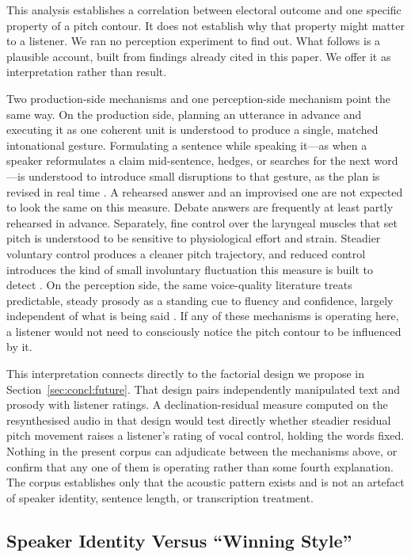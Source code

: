 \documentclass[pdflatex,sn-mathphys-num]{sn-jnl}%
\begin{document}
This analysis establishes a correlation between electoral outcome and one
specific property of a pitch contour. It does not establish why that
property might matter to a listener. We ran no perception experiment to
find out. What follows is a plausible account, built from findings already
cited in this paper. We offer it as interpretation rather than result.

Two production-side mechanisms and one perception-side mechanism point the
same way. On the production side, planning an utterance in advance and
executing it as one coherent unit is understood to produce a single, matched
intonational gesture. Formulating a sentence while speaking it---as when a speaker reformulates a
claim mid-sentence, hedges, or searches for the next word---is understood to
introduce small disruptions to that gesture, as the plan is revised in real
time \cite{levelt1989speaking}. A rehearsed answer and an
improvised one are not expected to look the same on this measure. Debate
answers are frequently at least partly rehearsed in advance.
Separately, fine control over the laryngeal muscles that set pitch is
understood to be sensitive to physiological effort and strain. Steadier
voluntary control produces a cleaner pitch trajectory, and reduced control
introduces the kind of small involuntary fluctuation this measure is built
to detect \cite{laver1980voice}. On the perception side, the same
voice-quality literature treats predictable, steady prosody as a standing
cue to fluency and confidence, largely independent of what is being said
\cite{laver1980voice}. If any of these mechanisms is operating here, a
listener would not need to consciously notice the pitch contour to be
influenced by it.

This interpretation connects directly to the factorial design we propose in
Section~\ref{sec:concl:future}. That design pairs independently manipulated
text and prosody with listener ratings. A declination-residual measure
computed on the resynthesised audio in that design would test directly
whether steadier residual pitch movement raises a listener's rating of
vocal control, holding the words fixed. Nothing in the present corpus can
adjudicate between the mechanisms above, or confirm that any one of them is
operating rather than some fourth explanation. The corpus establishes only
that the acoustic pattern exists and is not an artefact of speaker identity,
sentence length, or transcription treatment.

\subsection{Speaker Identity Versus ``Winning Style''}
\label{sec:disc:identity}
\end{document}
